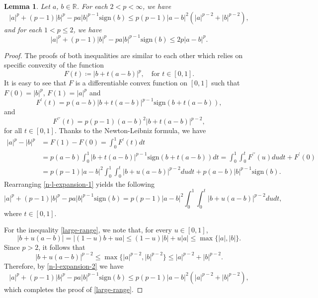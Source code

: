 \documentclass{amsbook}
\newtheorem{lemma}[theorem]{Lemma}
\theoremstyle{definition}
\theoremstyle{remark}
\numberwithin{section}{chapter}
\numberwithin{equation}{chapter}
\newcommand{\1}{\mathbf{1}}
\begin{document}
\begin{lemma}\label{basic-estimate-1-1}
Let  $a$, $b\in\mathbb{R}$. For each $2<p<\infty$, we have
\begin{equation}\label{large-range}
|a|^{p}+(p-1)|b|^{p}-pa|b|^{p-1}\mathrm{sign}(b)\leq p(p-1)|a-b|^{2}(|a|^{p-2}+|b|^{p-2}),
\end{equation}
and for each $1<p\leq 2$, we have
\begin{equation}\label{small-range}
|a|^{p}+(p-1)|b|^{p}-pa|b|^{p-1}\mathrm{sign}(b)\leq 2p|a-b|^{p}.
\end{equation}
\end{lemma}
\begin{proof}
The proofs of both inequalities are similar to each other which relies on specific convexity of the function
\[
F(t)\coloneqq |b+t(a-b)|^{p},\quad\mbox{for }t\in [0,1].
\]
It is easy to see that $F$ is a differentiable convex function on $[0,1]$ such that $F(0)=|b|^{p}$, $F(1)=|a|^{p}$ and
\[
F^{\prime}(t)=p(a-b)|b+t(a-b)|^{p-1}\mathrm{sign}(b+t(a-b)),
\]
and
\[
F^{\prime\prime}(t)=p(p-1)(a-b)^2|b+t(a-b)|^{p-2},
\]
for all $t\in [0,1]$. Thanks to the Newton-Leibniz formula, we have
\begin{equation}\label{n-l-expansion-1}
\begin{split}
|a|^{p}-|b|^{p}&=F(1)-F(0)=\int_{0}^1F^{\prime}(t)dt\\
&=p(a-b)\int_{0}^{1} |b+t(a-b)|^{p-1}\mathrm{sign}(b+t(a-b))dt=\int_{0}^{1}\int_{0}^{t}F^{\prime\prime}(u)dudt+F^{\prime}(0)\\
&=p(p-1)|a-b|^{2}\int_{0}^{1}\int_{0}^{t}|b+u(a-b)|^{p-2}dudt+p(a-b)|b|^{p-1}\mathrm{sign}(b).
\end{split}
\end{equation}
Rearranging \eqref{n-l-expansion-1} yields the following
\begin{equation}\label{n-l-expansion-2}
|a|^{p}+(p-1)|b|^{p}-pa|b|^{p-1}\mathrm{sign}(b)=p(p-1)|a-b|^{2}\int_{0}^{1}\int_{0}^{t}|b+u(a-b)|^{p-2}dudt,
\end{equation}
where $t\in [0,1]$.

For the inequality \eqref{large-range}, 
we note that, for every $u\in[0,1]$,
\[	|b+u(a-b)|
	=|(1-u)b+ua|
	\leq (1-u)|b|+u|a|
\leq \max\{|a|,|b|\}.
\]
Since $p>2$, it follows that
\[
|b+u(a-b)|^{p-2}
\leq \max\{|a|^{p-2},|b|^{p-2}\}
\leq |a|^{p-2}+|b|^{p-2}.
\]
Therefore, by \eqref{n-l-expansion-2} we have
\[
|a|^{p}+(p-1)|b|^{p}-pa|b|^{p-1}\mathrm{sign}(b)\leq p(p-1)|a-b|^{2}(|a|^{p-2}+|b|^{p-2}),
\]
which completes the proof of \eqref{large-range}.


\end{proof}
\end{document}
